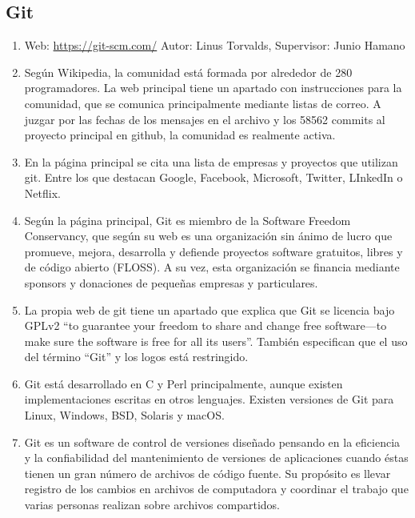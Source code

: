 \subsection{Git}
\begin{enumerate}
    \item Web: \url{https://git-scm.com/} Autor: Linus Torvalds, Supervisor: Junio Hamano
    \item Según Wikipedia, la comunidad está formada por alrededor de 280 programadores. La web principal tiene un apartado con instrucciones para la comunidad, que se comunica principalmente mediante listas de correo. A juzgar por las fechas de los mensajes en el archivo y los 58562 commits al proyecto principal en github, la comunidad es realmente activa.
    \item En la página principal se cita una lista de empresas y proyectos que utilizan git. Entre los que destacan Google, Facebook, Microsoft, Twitter, LInkedIn o Netflix.
    \item Según la página principal, Git es miembro de la Software Freedom Conservancy, que según su web es una organización sin ánimo de lucro que promueve, mejora, desarrolla y defiende proyectos software gratuitos, libres y de código abierto (FLOSS). A su vez, esta organización se financia mediante sponsors y donaciones de pequeñas empresas y particulares.
    \item La propia web de git tiene un apartado que explica que Git se licencia bajo GPLv2 “to guarantee your freedom to share and change free software---to make sure the software is free for all its users”. También especifican que el uso del término “Git” y los logos está restringido.
    \item Git está desarrollado en C y Perl principalmente, aunque existen implementaciones escritas en otros lenguajes. Existen versiones de Git para Linux, Windows, BSD, Solaris y macOS.
    \item Git es un software de control de versiones diseñado pensando en la eficiencia y la confiabilidad del mantenimiento de versiones de aplicaciones cuando éstas tienen un gran número de archivos de código fuente. Su propósito es llevar registro de los cambios en archivos de computadora y coordinar el trabajo que varias personas realizan sobre archivos compartidos.
\end{enumerate}


